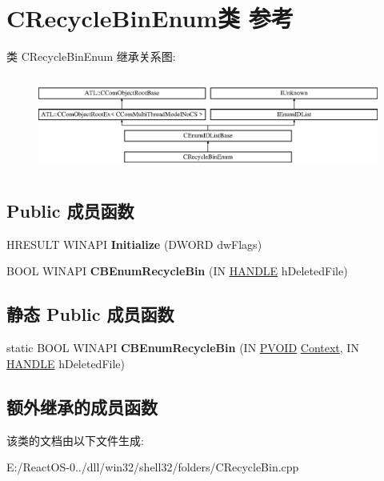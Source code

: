 \hypertarget{class_c_recycle_bin_enum}{}\section{C\+Recycle\+Bin\+Enum类 参考}
\label{class_c_recycle_bin_enum}
类 C\+Recycle\+Bin\+Enum 继承关系图\+:\begin{figure}[H]
\begin{center}
\leavevmode
\includegraphics[height=3.181818cm]{class_c_recycle_bin_enum}
\end{center}
\end{figure}
\subsection*{Public 成员函数}
\begin{DoxyCompactItemize}
\item 
\mbox{\label{class_c_recycle_bin_enum_a71785d945598903290b36f19230f79df}} 
H\+R\+E\+S\+U\+LT W\+I\+N\+A\+PI {\bfseries Initialize} (D\+W\+O\+RD dw\+Flags)
\item 
\mbox{\label{class_c_recycle_bin_enum_aee9ab9ec8137ac6bc03d127ccd7539ea}} 
B\+O\+OL W\+I\+N\+A\+PI {\bfseries C\+B\+Enum\+Recycle\+Bin} (IN \hyperlink{interfacevoid}{H\+A\+N\+D\+LE} h\+Deleted\+File)
\end{DoxyCompactItemize}
\subsection*{静态 Public 成员函数}
\begin{DoxyCompactItemize}
\item 
\mbox{\label{class_c_recycle_bin_enum_ad23f045bd9aa7363ffb3bc6316264db0}} 
static B\+O\+OL W\+I\+N\+A\+PI {\bfseries C\+B\+Enum\+Recycle\+Bin} (IN \hyperlink{interfacevoid}{P\+V\+O\+ID} \hyperlink{struct_context}{Context}, IN \hyperlink{interfacevoid}{H\+A\+N\+D\+LE} h\+Deleted\+File)
\end{DoxyCompactItemize}
\subsection*{额外继承的成员函数}


该类的文档由以下文件生成\+:\begin{DoxyCompactItemize}
\item 
E\+:/\+React\+O\+S-\/0../dll/win32/shell32/folders/C\+Recycle\+Bin.\+cpp\end{DoxyCompactItemize}

